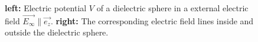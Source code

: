 \begin{figure}[!htbp]
\begin{subfigure}[b]{0.48\textwidth}
  \end{subfigure}
  \caption{\textbf{left:} Electric potential $V$ of a dielectric sphere in a external electric field $\vec{E_\infty} \parallel \vec{e_z}$. \textbf{right:} The corresponding electric field lines inside and outside the dielectric sphere.}
  \label{fig:dielectric-sphere-field}
\end{figure}